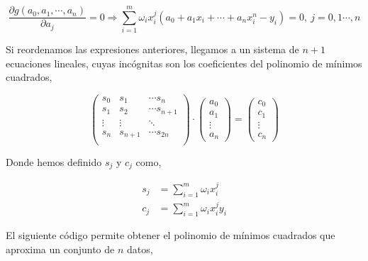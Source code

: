 \begin{equation*}
\frac{\partial g(a_0,a_1,\cdots, a_n)}{\partial a_j}=0 \Rightarrow \sum_{i=1}^m \omega_i x_i^j \left( a_0+a_1x_i+\cdots + a_nx_i^n-y_i\right)=0, \ j=0,1\cdots, n
\end{equation*} 
\begin{paracol}{2}
Si reordenamos las expresiones anteriores, llegamos a un sistema de $n+1$ ecuaciones lineales, cuyas incógnitas son los coeficientes del polinomio de mínimos cuadrados,
\end{paracol}
\begin{equation*}
\begin{pmatrix}
s_0& s_1& \cdots s_n\\
s_1& s_2& \cdots s_{n+1}\\
\vdots & \vdots & \ddots \\
s_n& s_{n+1}& \cdots s_{2n}\\
\end{pmatrix}\cdot \begin{pmatrix}
a_0\\
a_1\\
\vdots \\
a_n
\end{pmatrix}=\begin{pmatrix}
c_0\\
c_1\\
\vdots \\
c_n
\end{pmatrix}
\end{equation*} 
\begin{paracol}{2}
Donde hemos definido $s_j$ y $c_j$ como,
\end{paracol}
\begin{align*}
s_j&=\sum_{i=1}^m \omega_ix_i^j\\
c_j&=\sum_{i=1}^m \omega_ix_i^jy_i
\end{align*}
\begin{paracol}{2} 
El siguiente código permite obtener el polinomio de mínimos cuadrados que aproxima un conjunto de $n$ datos,
\end{paracol}
